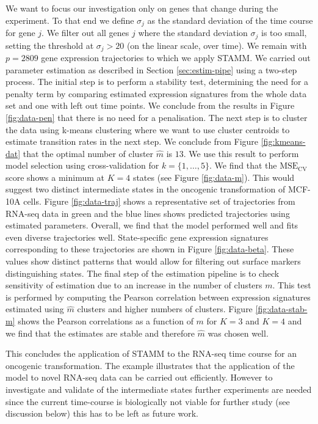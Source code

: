 We want to focus our investigation only on genes that change during the experiment. To that end we define $\sigma_j$ as the standard deviation of the time course for gene $j$. We filter out all genes $j$ where the standard deviation $\sigma_j$ is too small, setting the threshold at $\sigma_j > 20$ (on the linear scale, over time). We remain with $p=2809$ gene expression trajectories to which we apply STAMM. We carried out parameter estimation as described in Section \ref{sec:estim-pipe} using a two-step process. The initial step is to perform a stability test, determining the need for a penalty term by comparing estimated expression signatures from the whole data set and one with left out time points. We conclude from the results in Figure \ref{fig:data-pen} that there is no need for a penalisation. The next step is to cluster the data using k-means clustering where we want to use cluster centroids to estimate transition rates in the next step. We conclude from Figure \ref{fig:kmeans-dat} that the optimal number of cluster  $\hat{m}$ is $13$. We use this result to perform model selection using cross-validation for $k=\lbrace 1, \ldots, 5\rbrace$. We find that the $\mathrm{MSE_{CV}}$ score shows a minimum at $K=4$ states (see Figure \ref{fig:data-m}). This would suggest two distinct intermediate states in the oncogenic transformation of MCF-10A cells. Figure \ref{fig:data-traj} shows a representative set of trajectories from RNA-seq data in green and the blue lines shows predicted trajectories using estimated parameters. Overall, we find that the model performed well and fits even diverse trajectories well. State-specific gene expression signatures corresponding to these trajectories are shown in Figure \ref{fig:data-beta}. These values show distinct patterns that would allow for filtering out surface markers distinguishing states. The final step of the estimation pipeline is to check sensitivity of estimation due to an increase in the number of clusters $m$. This test is performed by computing the Pearson correlation between expression signatures estimated using $\hat{m}$ clusters and higher numbers of clusters. Figure \ref{fig:data-stab-m} shows the Pearson correlations as a function of $m$ for $K=3$ and $K=4$ and we find that the estimates are stable and therefore $\hat{m}$ was chosen well.

This concludes the application of STAMM to the RNA-seq time course for an oncogenic transformation. The example illustrates that the application of the model to novel RNA-seq data can be carried out efficiently. However to investigate and validate of the intermediate states further experiments are needed since the current time-course is biologically not viable for further study (see discussion below) this has to be left as future work.


